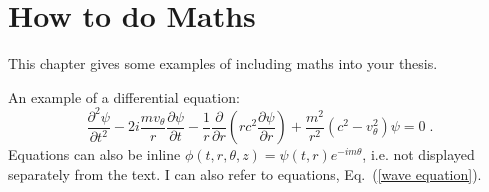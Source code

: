 \chapter{How to do Maths}

This chapter gives some examples of including maths into your thesis.

An example of a differential equation:
%
\begin{equation} 
\frac{\partial^2 \psi}{\partial t^2} -2i \frac{m v_\theta}{r} \frac{\partial \psi}{\partial t} -
\frac{1}{r} \frac{\partial}{\partial r} \left( r c^{2} \frac{\partial \psi}{\partial r} \right) 
+ \frac{m^{2}}{r^2} \left( c^{2} - v_\theta^{2} \right)  \psi  
= 0 \; .
\label{wave equation}
\end{equation}
%
Equations can also be inline $\phi (t, r, \theta, z) = \psi(t,r) e^{-i m \theta}$, i.e. not displayed separately from the text. I can also refer to equations, Eq.~(\ref{wave equation}).
